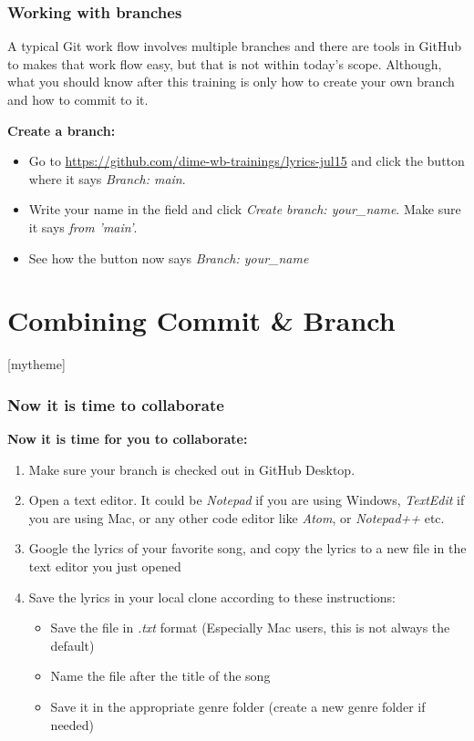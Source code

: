 \documentclass[aspectratio=169]{beamer}
\newcommand{\sectionpic}[2]{
	\section{#1}
	\setbeamertemplate{section page}[mytheme]
}
\newcommand{\trainingURL}[1]{{\color{blue}\url{#1}}}
\newcommand{\traininerUsername}{dime-wb-trainings}
\newcommand{\repoName}{\traininerUsername/lyrics-jul15}
\newcommand{\trainingRepoURL}{\href{https://github.com/\repoName}{\trainingURL{https://github.com/\repoName}}}
\begin{document}
\begin{frame}
\frametitle{Working with branches}

	A typical Git work flow involves multiple branches and there are tools in GitHub to makes that work flow easy, but that is not within today's scope. Although, what you should know after this training is only how to create your own branch and how to commit to it.

	\textbf{Create a branch:}
	\begin{itemize}
		\item Go to \trainingRepoURL{} and click the button where it says \textit{Branch: main}.
		\item Write your name in the field and click \textit{Create branch: your\_name}. Make sure it says \textit{from 'main'}.
		\item See how the button now says \textit{Branch: your\_name}
	\end{itemize}

\end{frame}

\sectionpic{Combining Commit \& Branch}{}

\begin{frame}
\frametitle{Now it is time to collaborate}

\textbf{Now it is time for you to collaborate:}
\begin{enumerate}
	\item Make sure your branch is checked out in GitHub Desktop.
	\item Open a text editor. It could be \textit{Notepad} if you are using Windows, \textit{TextEdit} if you are using Mac, or any other code editor like \textit{Atom}, or \textit{Notepad++} etc.
	\item Google the lyrics of your favorite song, and copy the lyrics to a new file in the text editor you just opened
	\item Save the lyrics in your local clone according to these instructions:
	\begin{itemize}
		\item Save the file in \textit{.txt} format (Especially Mac users, this is not always the default)
		\item Name the file after the title of the song
		\item Save it in the appropriate genre folder (create a new genre folder if needed)
	\end{itemize}
\end{enumerate}

\end{frame}
\end{document}
